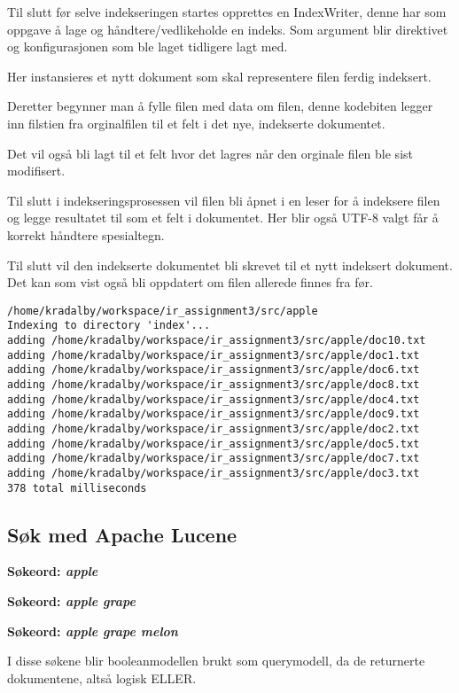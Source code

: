 
Til slutt før selve indekseringen startes opprettes en IndexWriter, denne har som oppgave å lage og håndtere/vedlikeholde en indeks. Som argument blir direktivet og konfigurasjonen som ble laget tidligere lagt med.


Her instansieres et nytt dokument som skal representere filen ferdig indeksert.


Deretter begynner man å fylle filen med data om filen, denne kodebiten legger inn filstien fra orginalfilen til et felt i det nye, indekserte dokumentet. 


Det vil også bli lagt til et felt hvor det lagres når den orginale filen ble sist modifisert.


Til slutt i indekseringsprosessen vil filen bli åpnet i en leser for å indeksere filen og legge resultatet til som et felt i dokumentet. Her blir også UTF-8 valgt får å korrekt håndtere spesialtegn.

Til slutt vil den indekserte dokumentet bli skrevet til et nytt indeksert dokument. Det kan som vist også bli oppdatert om filen allerede finnes fra før.


\begin{lstlisting}[frame=single]  % Start your code-block
/home/kradalby/workspace/ir_assignment3/src/apple
Indexing to directory 'index'...
adding /home/kradalby/workspace/ir_assignment3/src/apple/doc10.txt
adding /home/kradalby/workspace/ir_assignment3/src/apple/doc1.txt
adding /home/kradalby/workspace/ir_assignment3/src/apple/doc6.txt
adding /home/kradalby/workspace/ir_assignment3/src/apple/doc8.txt
adding /home/kradalby/workspace/ir_assignment3/src/apple/doc4.txt
adding /home/kradalby/workspace/ir_assignment3/src/apple/doc9.txt
adding /home/kradalby/workspace/ir_assignment3/src/apple/doc2.txt
adding /home/kradalby/workspace/ir_assignment3/src/apple/doc5.txt
adding /home/kradalby/workspace/ir_assignment3/src/apple/doc7.txt
adding /home/kradalby/workspace/ir_assignment3/src/apple/doc3.txt
378 total milliseconds
\end{lstlisting}
\pagebreak
\subsection*{Søk med Apache Lucene}
\noindent \textbf{Søkeord: \textit{apple}}

\noindent \textbf{Søkeord: \textit{apple grape}}

\noindent \textbf{Søkeord: \textit{apple grape melon}}


I disse søkene blir booleanmodellen brukt som querymodell, da de returnerte dokumentene, altså logisk ELLER.
